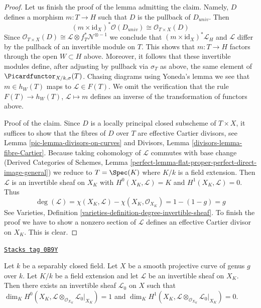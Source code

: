 \begin{proof}
\medskip\noindent
Let us finish the proof of the lemma admitting the claim.
Namely, $D$ defines a morphism $m : T \to H$ such that $D$ is the pullback of
$D_{univ}$. Then
$$
(m \times \text{id}_X)^*\mathcal{O}(D_{univ}) \cong
\mathcal{O}_{T \times X}(D)
$$
Since $\mathcal{O}_{T \times X}(D) \cong
\mathcal{L} \otimes f_T^*\mathcal{N}^{\otimes -1}$
we conclude that $(m \times \text{id}_X)^*\mathcal{L}_H$ and $\mathcal{L}$
differ by the pullback of an invertible module on $T$.
This shows that $m : T \to H$ factors through the open $W \subset H$ above.
Moreover, it follows that these invertible modules define, after adjusting
by pullback via $\sigma_T$ as above, the same element of
$\Picardfunctor_{X/k, \sigma}(T)$. Chasing diagrams using Yoneda's lemma
we see that $m \in h_W(T)$ maps to $\mathcal{L} \in F(T)$. We omit
the verification that the rule $F(T) \to h_W(T)$,
$\mathcal{L} \mapsto m$ defines an inverse of the transformation
of functors above.

\medskip\noindent
Proof of the claim. Since $D$ is a locally principal closed subscheme
of $T \times X$, it suffices to show that the fibres of $D$ over $T$ are
effective Cartier divisors, see Lemma \ref{pic-lemma-divisors-on-curves} and
Divisors, Lemma \ref{divisors-lemma-fibre-Cartier}. Because taking
cohomology of $\mathcal{L}$ commutes with base change
(Derived Categories of Schemes, Lemma
\ref{perfect-lemma-flat-proper-perfect-direct-image-general})
we reduce to $T = \Spec(K)$ where $K/k$ is a field extension.
Then $\mathcal{L}$ is an invertible sheaf on $X_K$ with
$H^0(X_K, \mathcal{L}) = K$ and $H^1(X_K, \mathcal{L}) = 0$. Thus
$$
\deg(\mathcal{L}) = \chi(X_K, \mathcal{L}) - \chi(X_K, \mathcal{O}_{X_K})
= 1 - (1 - g) = g
$$
See Varieties, Definition \ref{varieties-definition-degree-invertible-sheaf}.
To finish the proof we have to show a nonzero section of $\mathcal{L}$
defines an effective Cartier divisor on $X_K$.
This is clear.
\end{proof}

\begin{lemma}
\label{pic-lemma-twist-with-general-divisor}
\href{https://stacks.math.columbia.edu/tag/0B9Y}{\texttt{Stacks tag 0B9Y}}

Let $k$ be a separably closed field. Let $X$ be a smooth projective
curve of genus $g$ over $k$. Let $K/k$ be a field extension and let
$\mathcal{L}$ be an invertible sheaf on $X_K$. Then there exists an
invertible sheaf $\mathcal{L}_0$ on $X$ such that
$\dim_K H^0(X_K,
\mathcal{L} \otimes_{\mathcal{O}_{X_K}} \mathcal{L}_0|_{X_K}) = 1$ and
$\dim_K H^1(X_K,
\mathcal{L} \otimes_{\mathcal{O}_{X_K}} \mathcal{L}_0|_{X_K}) = 0$.
\end{lemma}

